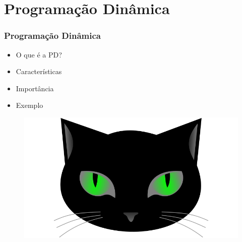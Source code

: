 
       
\section{Programação Dinâmica}

\begin{frame}
\frametitle{Programação Dinâmica}
\begin{minipage}{0.47\textwidth}
    \begin{itemize}
        \item O que é a PD?
        \item Características
        \item Importância
        \item Exemplo
        
    \end{itemize}
\end{minipage}
\begin{minipage}{0.5\textwidth}
\begin{figure}[ht!]
\begin{center}
\includegraphics[width=1.2\textwidth, height=0.40\textheight]{figures/logo_picat_alex.jpg}
\end{center}
\end{figure}
\end{minipage}
\end{frame}


